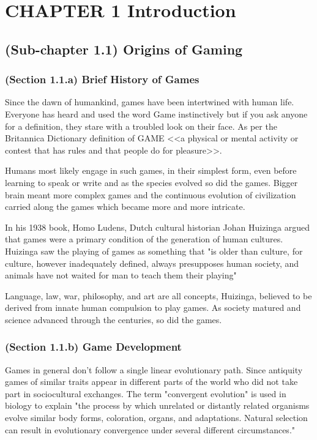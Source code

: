 \documentclass[a4paper,one side,12pt]{book}
\begin{document}
\chapter{CHAPTER 1 Introduction}


\section{(Sub-chapter 1.1) Origins of Gaming}

\subsection{(Section 1.1.a) Brief History of Games}

Since the dawn of humankind, games have been intertwined with human
life. Everyone has heard and used the word Game instinctively but if you ask anyone for a definition, they stare with a troubled look on their face.
As per the Britannica Dictionary definition of GAME \textless\textless a
physical or mental activity or contest that has rules and that people do
for pleasure\textgreater\textgreater.\cite{brittanica_game}

Humans most likely engage in such games, in their
simplest form, even before learning to speak or write and as the species
evolved so did the games. Bigger brain meant more complex games and the
continuous evolution of civilization carried along the games which
became more and more intricate.

In his 1938 book, Homo Ludens\cite{huizinga_1955_homo}, Dutch cultural historian Johan Huizinga argued that games were a primary condition of the generation of human cultures. Huizinga saw the playing of games as something that "is older than culture, for culture, however inadequately defined, always presupposes human society, and animals have not waited for man to teach them their playing"

Language, law, war, philosophy, and art are all concepts, Huizinga,
believed to be derived from innate human compulsion to play games. As
society matured and science advanced through the centuries, so did the
games.

\subsection{(Section 1.1.b) Game Development}

Games in general don't follow a single linear evolutionary path. Since
antiquity games of similar traits appear in different parts of the world
who did not take part in sociocultural exchanges. The term "convergent
evolution" is used in biology to explain  "the process
by which unrelated or distantly related organisms evolve similar body
forms, coloration, organs, and adaptations. Natural selection can result
in evolutionary convergence under several different
circumstances." \cite{pianka_convergent}
\end{document}
